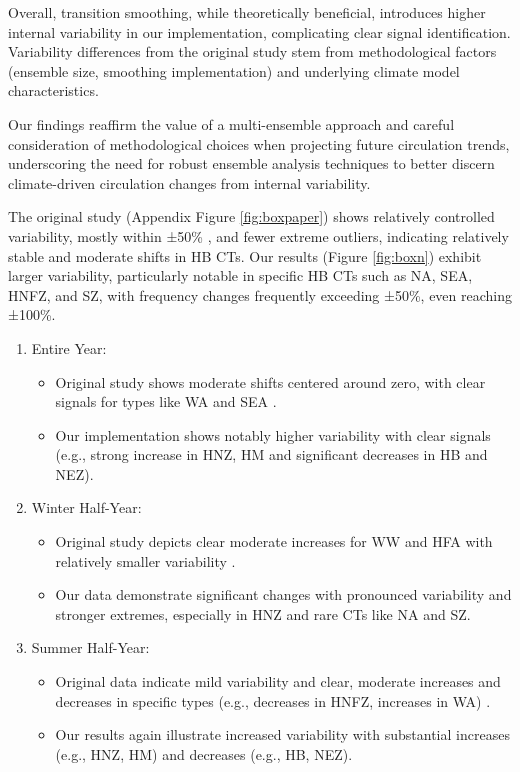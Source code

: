 \documentclass[
]{krantz}
\providecommand{\tightlist}{%
  \setlength{\itemsep}{0pt}\setlength{\parskip}{0pt}}
\begin{document}
Overall, transition smoothing, while theoretically beneficial, introduces higher internal variability in our implementation, complicating clear signal identification.
Variability differences from the original study stem from methodological factors (ensemble size, smoothing implementation) and underlying climate model characteristics.

Our findings reaffirm the value of a multi-ensemble approach and careful consideration of methodological choices when projecting future circulation trends,
underscoring the need for robust ensemble analysis techniques to better discern climate-driven circulation changes from internal variability.

The original study (Appendix Figure \ref{fig:boxpaper}) shows relatively controlled variability, mostly within ±50\% \citep{Mittermeier2022}, and fewer extreme outliers, indicating relatively stable and moderate shifts in HB CTs.
Our results (Figure \ref{fig:boxn}) exhibit larger variability, particularly notable in specific HB CTs such as NA, SEA, HNFZ, and SZ, with frequency changes frequently exceeding ±50\%, even reaching ±100\%.

\begin{enumerate}
\def\labelenumi{\arabic{enumi}.}
\tightlist
\item
  Entire Year:

  \begin{itemize}
  \tightlist
  \item
    Original study shows moderate shifts centered around zero, with clear signals for types like WA and SEA \citep{Mittermeier2022}.
  \item
    Our implementation shows notably higher variability with clear signals (e.g., strong increase in HNZ, HM and significant decreases in HB and NEZ).
  \end{itemize}
\item
  Winter Half-Year:

  \begin{itemize}
  \tightlist
  \item
    Original study depicts clear moderate increases for WW and HFA with relatively smaller variability \citep{Mittermeier2022}.
  \item
    Our data demonstrate significant changes with pronounced variability and stronger extremes, especially in HNZ and rare CTs like NA and SZ.
  \end{itemize}
\item
  Summer Half-Year:

  \begin{itemize}
  \tightlist
  \item
    Original data indicate mild variability and clear, moderate increases and decreases in specific types (e.g., decreases in HNFZ, increases in WA) \citep{Mittermeier2022}.
  \item
    Our results again illustrate increased variability with substantial increases (e.g., HNZ, HM) and decreases (e.g., HB, NEZ).
  \end{itemize}
\end{enumerate}
\end{document}
